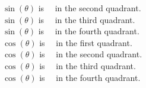 \documentclass{ximera}
\begin{document}
\begin{example}
$\sin(\theta)$ is \,   \, in the second quadrant. \\

$\sin(\theta)$ is \,   \, in the third quadrant. \\

$\sin(\theta)$ is \,   \, in the fourth quadrant. \\





$\cos(\theta)$ is \,   \, in the first quadrant. \\

$\cos(\theta)$ is \,   \, in the second quadrant. \\

$\cos(\theta)$ is \,   \, in the third quadrant. \\

$\cos(\theta)$ is \,   \, in the fourth quadrant. \\
\\











\end{example}
\end{document}
